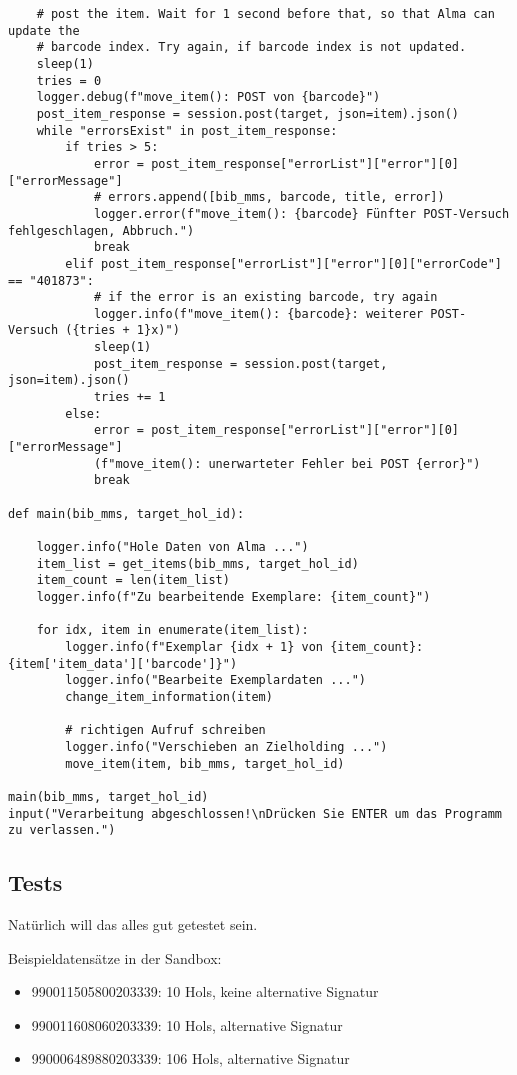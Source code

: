 \documentclass[10pt, a4paper]{scrartcl}
\begin{document}
\begin{verbatim}
    # post the item. Wait for 1 second before that, so that Alma can update the
    # barcode index. Try again, if barcode index is not updated.
    sleep(1)
    tries = 0
    logger.debug(f"move_item(): POST von {barcode}")
    post_item_response = session.post(target, json=item).json()
    while "errorsExist" in post_item_response:
        if tries > 5:
            error = post_item_response["errorList"]["error"][0]["errorMessage"]
            # errors.append([bib_mms, barcode, title, error])
            logger.error(f"move_item(): {barcode} Fünfter POST-Versuch fehlgeschlagen, Abbruch.")
            break
        elif post_item_response["errorList"]["error"][0]["errorCode"] == "401873":
            # if the error is an existing barcode, try again
            logger.info(f"move_item(): {barcode}: weiterer POST-Versuch ({tries + 1}x)")
            sleep(1)
            post_item_response = session.post(target, json=item).json()
            tries += 1
        else:
            error = post_item_response["errorList"]["error"][0]["errorMessage"]
            (f"move_item(): unerwarteter Fehler bei POST {error}")
            break

def main(bib_mms, target_hol_id):

    logger.info("Hole Daten von Alma ...")
    item_list = get_items(bib_mms, target_hol_id)
    item_count = len(item_list)
    logger.info(f"Zu bearbeitende Exemplare: {item_count}")

    for idx, item in enumerate(item_list):
        logger.info(f"Exemplar {idx + 1} von {item_count}: {item['item_data']['barcode']}")
        logger.info("Bearbeite Exemplardaten ...")
        change_item_information(item)

        # richtigen Aufruf schreiben
        logger.info("Verschieben an Zielholding ...")
        move_item(item, bib_mms, target_hol_id)

main(bib_mms, target_hol_id)
input("Verarbeitung abgeschlossen!\nDrücken Sie ENTER um das Programm zu verlassen.")
\end{verbatim}

\subsection{Tests}
\label{sec:org872c74a}
Natürlich will das alles gut getestet sein.

Beispieldatensätze in der Sandbox:
\begin{itemize}
\item 990011505800203339: 10 Hols, keine alternative Signatur
\item 990011608060203339: 10 Hols, alternative Signatur
\item 990006489880203339: 106 Hols, alternative Signatur
\end{itemize}
\end{document}
